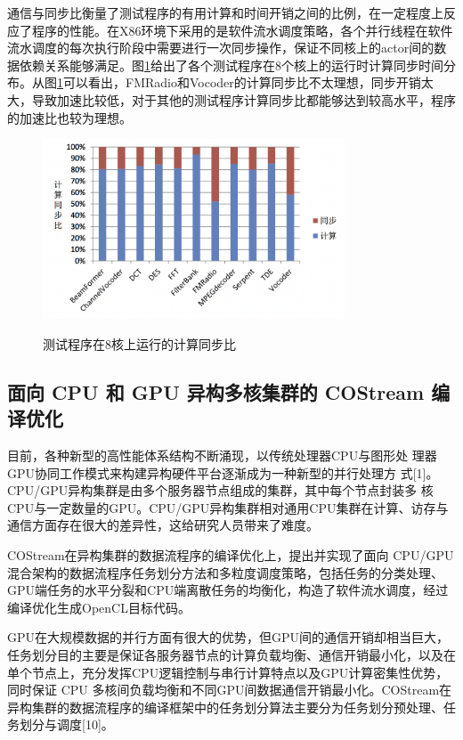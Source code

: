 通信与同步比衡量了测试程序的有用计算和时间开销之间的比例，在一定程度上反应了程序的性能。在X86环境下采用的是软件流水调度策略，各个并行线程在软件流水调度的每次执行阶段中需要进行一次同步操作，保证不同核上的actor间的数据依赖关系能够满足。图\ref{fig:x86computeSync}给出了各个测试程序在8个核上的运行时计算同步时间分布。从图\ref{fig:x86computeSync}可以看出，FMRadio和Vocoder的计算同步比不太理想，同步开销太大，导致加速比较低，对于其他的测试程序计算同步比都能够达到较高水平，程序的加速比也较为理想。

\begin{figure}[htbp]
  \centering
  \includegraphics[width=0.8\textwidth]{Img/Chap_Application/Yu/x86computeSync.png}\\
  \caption{测试程序在8核上运行的计算同步比}\label{fig:x86computeSync}
\end{figure}

\subsection{面向 CPU 和 GPU 异构多核集群的 COStream 编译优化}

目前，各种新型的高性能体系结构不断涌现，以传统处理器CPU与图形处 理器GPU协同工作模式来构建异构硬件平台逐渐成为一种新型的并行处理方 式[1]。CPU/GPU异构集群是由多个服务器节点组成的集群，其中每个节点封装多 核CPU与一定数量的GPU。CPU/GPU异构集群相对通用CPU集群在计算、访存与通信方面存在很大的差异性，这给研究人员带来了难度。 

COStream在异构集群的数据流程序的编译优化上，提出并实现了面向 CPU/GPU混合架构的数据流程序任务划分方法和多粒度调度策略，包括任务的分类处理、GPU端任务的水平分裂和CPU端离散任务的均衡化，构造了软件流水调度，经过编译优化生成OpenCL目标代码。

GPU在大规模数据的并行方面有很大的优势，但GPU间的通信开销却相当巨大，任务划分目的主要是保证各服务器节点的计算负载均衡、通信开销最小化，以及在单个节点上，充分发挥CPU逻辑控制与串行计算特点以及GPU计算密集性优势，同时保证 CPU 多核间负载均衡和不同GPU间数据通信开销最小化。COStream在异构集群的数据流程序的编译框架中的任务划分算法主要分为任务划分预处理、任务划分与调度[10]。

